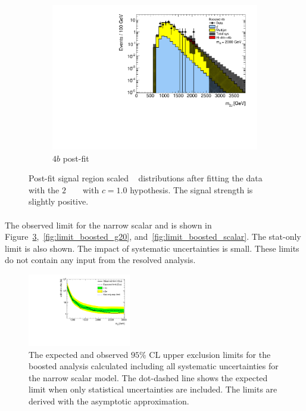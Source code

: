 \begin{figure}[htb!]
    \begin{subfigure}[b]{0.33\textwidth}
        \includegraphics[width=\textwidth,angle=-90]{figures/boosted/results/postfitplot_s_2000_b4b.pdf}
        \caption{$4b$ post-fit}
        \label{fig:postfit4b}
    \end{subfigure}
\caption{Post-fit signal region scaled \mtwoJ~ distributions after fitting the data with the $2$ \TeV~ \Grav~ with $c=1.0$ hypothesis. The signal strength is slightly positive.}
\label{fig:postfit2000}
\end{figure}

\paragraph{}
The observed limit for the narrow scalar and \Grav is shown in Figure~\ref{fig:limit_boosted_g10},~\ref{fig:limit_boosted_g20}, and~\ref{fig:limit_boosted_scalar}.
The stat-only limit is also shown. The impact of systematic uncertainties is small. 
These limits do not contain any input from the resolved analysis.

\begin{figure}
\begin{center}
\includegraphics[width=0.4\textwidth,angle=-90]{figures/boosted/results/limit_boosted_boosted_okt18_s.pdf}
\caption{The expected and observed $95\%$ CL upper exclusion limits for the boosted analysis calculated including all systematic uncertainties for the narrow scalar model. The dot-dashed line shows the expected limit when only statistical uncertainties are included. The limits are derived with the asymptotic approximation.}
\label{fig:limit_boosted_g10}
\end{center}
\end{figure}

